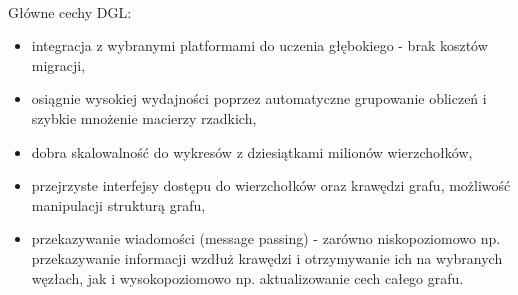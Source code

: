 \documentclass{article}
\begin{document}
\paragraph{}
Główne cechy DGL:
\begin{itemize}
  \item
  integracja z wybranymi platformami do uczenia głębokiego - brak kosztów migracji, 
  \item 
  osiągnie wysokiej wydajności poprzez automatyczne grupowanie obliczeń i szybkie mnożenie macierzy rzadkich,
  \item 
  dobra skalowalność do wykresów z dziesiątkami milionów wierzchołków,
  \item 
  przejrzyste interfejsy dostępu do wierzchołków oraz krawędzi grafu, możliwość manipulacji strukturą grafu,
  \item 
  przekazywanie wiadomości (message passing) - zarówno niskopoziomowo np. przekazywanie informacji wzdłuż krawędzi i otrzymywanie ich na wybranych węzłach, jak i wysokopoziomowo np. aktualizowanie cech całego grafu.
  
 \end{itemize}
\end{document}
